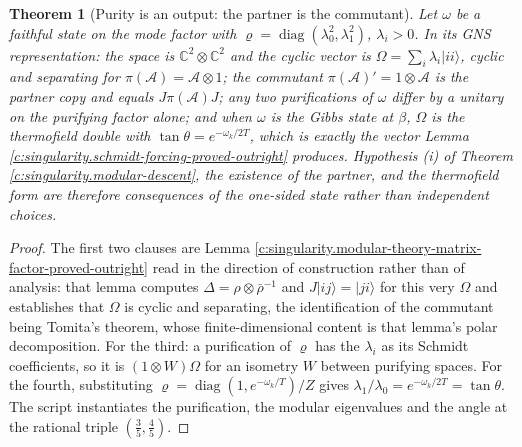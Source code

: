 \documentclass[11pt]{article}
\newtheorem{theorem}{Theorem}[section]
\theoremstyle{definition}
\theoremstyle{plain}
\providecommand{\Aa}{}\renewcommand{\Aa}{\mathcal{A}}
\providecommand{\C}{}\renewcommand{\C}{\mathbb{C}}
\begin{document}
\begin{theorem}[Purity is an output: the partner is the commutant]\label{c:singularity.purity-output-partner-commutant}
Let $\omega$ be a faithful state on the mode factor with $\varrho = \operatorname{diag}(\lambda_0^{2}, \lambda_1^{2})$, $\lambda_i > 0$. In its GNS representation: the space is $\C^{2}\otimes\C^{2}$ and the cyclic vector is $\Omega = \sum_i \lambda_i|ii\rangle$, cyclic and separating for $\pi(\Aa) = \Aa\otimes 1$; the commutant $\pi(\Aa)' = 1 \otimes \Aa$ is the partner copy and equals $J\pi(\Aa)J$; any two purifications of $\omega$ differ by a unitary on the purifying factor alone; and when $\omega$ is the Gibbs state at $\beta$, $\Omega$ is the thermofield double with $\tan\theta = e^{-\omega_k/2T}$, which is exactly the vector Lemma \ref{c:singularity.schmidt-forcing-proved-outright} produces. Hypothesis (i) of Theorem \ref{c:singularity.modular-descent}, the existence of the partner, and the thermofield form are therefore consequences of the one-sided state rather than independent choices.
\end{theorem}
\begin{proof}
The first two clauses are Lemma \ref{c:singularity.modular-theory-matrix-factor-proved-outright} read in the direction of construction rather than of analysis: that lemma computes $\Delta = \rho\otimes\bar\rho^{-1}$ and $J|ij\rangle = |ji\rangle$ for this very $\Omega$ and establishes that $\Omega$ is cyclic and separating, the identification of the commutant being Tomita's theorem, whose finite-dimensional content is that lemma's polar decomposition. For the third: a purification of $\varrho$ has the $\lambda_i$ as its Schmidt coefficients, so it is $(1\otimes W)\Omega$ for an isometry $W$ between purifying spaces. For the fourth, substituting $\varrho = \operatorname{diag}(1, e^{-\omega_k/T})/Z$ gives $\lambda_1/\lambda_0 = e^{-\omega_k/2T} = \tan\theta$. The script instantiates the purification, the modular eigenvalues and the angle at the rational triple $(\tfrac35, \tfrac45)$.

\end{proof}
\end{document}
